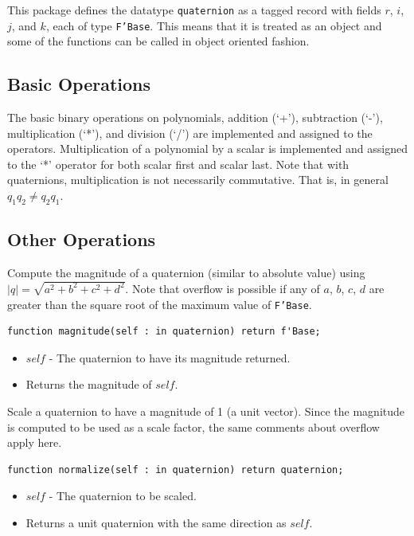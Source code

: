 \documentclass[10pt, openany]{book}
\newcommand{\indexfunc}[1]{\index[func]{#1}}
\newcommand{\datatype}[1]{\texttt{#1}}
\begin{document}
This package defines the datatype \datatype{quaternion} as a tagged record with fields $r$, $i$, $j$, and $k$, each of type \datatype{F'Base}.  This means that it is treated as an object and some of the functions can be called in object oriented fashion.

\subsection{Basic Operations}
The basic binary operations on polynomials, addition (`+'), subtraction (`-'), multiplication (`*'), and division (`/') are implemented and assigned to the operators.  Multiplication of a polynomial by a scalar is implemented and assigned to the `*' operator for both scalar first and scalar last.  Note that with quaternions, multiplication is not necessarily commutative.  That is, in general $q_1 q_2 \neq q_2 q_1$.

\subsection{Other Operations}

Compute the magnitude of a quaternion (similar to absolute value) using $|q| = \sqrt{a^2+b^2+c^2+d^2}$.  Note that overflow is possible if any of $a$, $b$, $c$, $d$ are greater than the square root of the maximum value of \datatype{F'Base}.
\begin{lstlisting}
function magnitude(self : in quaternion) return f'Base;
\end{lstlisting}
\indexfunc{quat-magnitude}
\begin{itemize}
  \item $self$ - The quaternion to have its magnitude returned.
  \item Returns the magnitude of $self$.
\end{itemize}

Scale a quaternion to have a magnitude of 1 (a unit vector).  Since the magnitude is computed to be used as a scale factor, the same comments about overflow apply here.
\begin{lstlisting}
function normalize(self : in quaternion) return quaternion;
\end{lstlisting}
\indexfunc{quat-normalize}
\begin{itemize}
  \item $self$ - The quaternion to be scaled.
  \item Returns a unit quaternion with the same direction as $self$.
\end{itemize}
\end{document}
